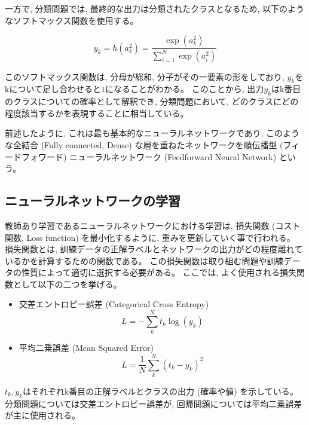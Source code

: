 一方で, 分類問題では, 最終的な出力は分類されたクラスとなるため, 以下のようなソフトマックス関数を使用する。

\begin{equation}
 y_k = h(a^2_k) = \frac{\exp{(a^2_k)}}{\sum^N_{i=1}\exp{(a^2_i)}}
\end{equation}

このソフトマックス関数は, 分母が総和, 分子がその一要素の形をしており, $y_k$をkについて足し合わせると$1$になることがわかる。
このことから, 出力$y_k$はk番目のクラスについての確率として解釈でき, 分類問題において, どのクラスにどの程度該当するかを表現することに相当している。

前述したように, これは最も基本的なニューラルネットワークであり, このような全結合 (Fully connected, Dense) な層を重ねたネットワークを順伝播型 (フィードフォワード) ニューラルネットワーク (Feedforward Neural Network) という。


\subsection{ニューラルネットワークの学習} \label{DL:NN:TrainingofNN}


教師あり学習であるニューラルネットワークにおける学習は, 損失関数 (コスト関数, Loss function) を最小化するように, 重みを更新していく事で行われる。
損失関数とは, 訓練データの正解ラベルとネットワークの出力がどの程度離れているかを計算するための関数である。
この損失関数は取り組む問題や訓練データの性質によって適切に選択する必要がある。
ここでは, よく使用される損失関数として以下の二つを挙げる。
\begin{itemize}
  \item 交差エントロピー誤差 (Categorical Cross Entropy)
\begin{equation}
 L = - \sum^N_k t_k \log{(y_k)}
\end{equation}
  \item 平均二乗誤差 (Mean Squared Error)
\begin{equation}
 L = \frac{1}{N} \sum^N_k(t_k - y_k)^2
\end{equation}
\end{itemize}
$t_k, y_k$はそれぞれk番目の正解ラベルとクラスの出力 (確率や値) を示している。
分類問題については交差エントロピー誤差が, 回帰問題については平均二乗誤差が主に使用される。

